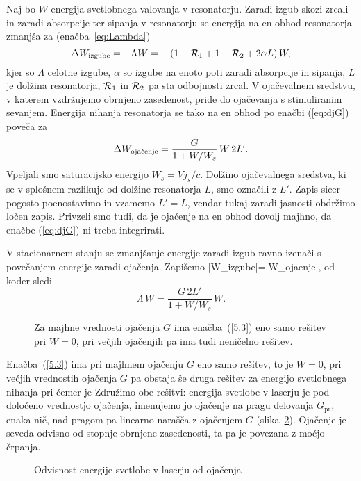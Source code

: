 Naj bo $W$ energija svetlobnega valovanja v resonatorju. Zaradi izgub skozi
zrcali in zaradi absorpcije ter sipanja v resonatorju se energija na en obhod 
resonatorja zmanjša za (enačba~\ref{eq:Lambda})
\begin{equation}
\Delta W_{\rm izgube}=-\Lambda W=-\left(1-{\cal {R}}_{1}+1-{\cal {R}}_{2}
+2\alpha L\right)W,
\label{5.1}
\end{equation}
kjer so $\Lambda $ celotne izgube, $\alpha$ so izgube na enoto poti zaradi
absorpcije in sipanja, $L$ je dolžina resonatorja, 
${\cal {R}}_{1}$ in ${\cal {R}}_{2}$ pa sta odbojnosti
zrcal. V ojačevalnem sredstvu, v katerem vzdržujemo obrnjeno zasedenost,
pride do ojačevanja s stimuliranim sevanjem. Energija nihanja resonatorja 
se tako na en obhod po enačbi (\ref{eq:djG}) poveča za 
\begin{equation}  
\Delta W_{\rm oja\check{c}enje}=\frac{G}{1+W/W_s}\,W\, 2L'.
\label{5.2}
\end{equation}
Vpeljali smo saturacijsko energijo $W_s=Vj_s/c$. Dolžino ojačevalnega sredstva,
ki se v splošnem razlikuje od dolžine resonatorja $L$, smo označili z $L'$.
Zapis sicer pogosto poenostavimo in vzamemo $L'=L$, vendar tukaj zaradi
jasnosti obdržimo ločen zapis. Privzeli smo tudi, da je ojačenje na en
obhod dovolj majhno, da enačbe (\ref{eq:djG}) ni treba integrirati.

V stacionarnem stanju se zmanjšanje energije zaradi izgub ravno izenači 
s povečanjem energije zaradi ojačenja. Zapišemo
\beq
|\Delta W_{\rm izgube}|=|\Delta W_{\rm ojaenje}|,
\eeq
od koder sledi
\begin{equation}  
\Lambda\, W=\frac{G\,2L'}{1+W/W_s}\,W.
\label{5.3}
\end{equation}
\begin{figure}[h]
\centering
\def\svgwidth{140truemm} 

\caption{Za majhne vrednosti ojačenja $G$ ima enačba~(\ref{5.3}) eno samo 
rešitev pri $W=0$, pri večjih ojačenjih pa ima tudi neničelno rešitev.}
\label{fig:stacio}
\end{figure}

Enačba~(\ref{5.3}) ima pri majhnem ojačenju $G$ eno samo rešitev, to je 
$W=0$, pri večjih vrednostih ojačenja $G$ pa obstaja še druga rešitev
za energijo svetlobnega nihanja
pri čemer je
Združimo obe rešitvi: energija svetlobe v laserju je pod določeno
vrednostjo ojačenja, imenujemo jo ojačenje na pragu delovanja $G_\mathrm{pr}$, enaka
nič, nad pragom pa linearno narašča z ojačenjem $G$ (slika~\ref{fig:energija}).
Ojačenje je seveda odvisno od stopnje obrnjene zasedenosti, ta pa je povezana
z močjo črpanja.
\begin{figure}[h]
\centering
\def\svgwidth{60truemm} 

\caption{Odvisnost energije svetlobe v laserju od ojačenja}
\label{fig:energija}
\end{figure}


